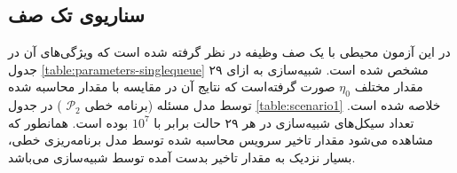 \subsection{سناریوی تک صف}
در این آزمون محیطی با یک صف وظیفه در نظر گرفته شده است که ویژگی‌های آن در جدول \ref{table:parameters-singlequeue} مشخص شده است. شبیه‌سازی به ازای ۲۹ مقدار مختلف $\eta_0$ صورت گرفته‌است که نتایج آن در مقایسه با مقدار محاسبه شده توسط مدل مسئله (برنامه خطی
$\mathcal{P}_2$
) در جدول \ref{table:scenario1} خلاصه شده است. تعداد سیکل‌های شبیه‌سازی در هر ۲۹ حالت برابر با $10^7$ بوده است. همانطور که مشاهده می‌شود مقدار تاخیر سرویس محاسبه شده توسط مدل برنامه‌ریزی خطی، بسیار نزدیک به مقدار تاخیر بدست آمده توسط شبیه‌سازی می‌باشد.
\begin{table}
	\centering
	\begin{latin}
		

\end{latin}
\end{table}
